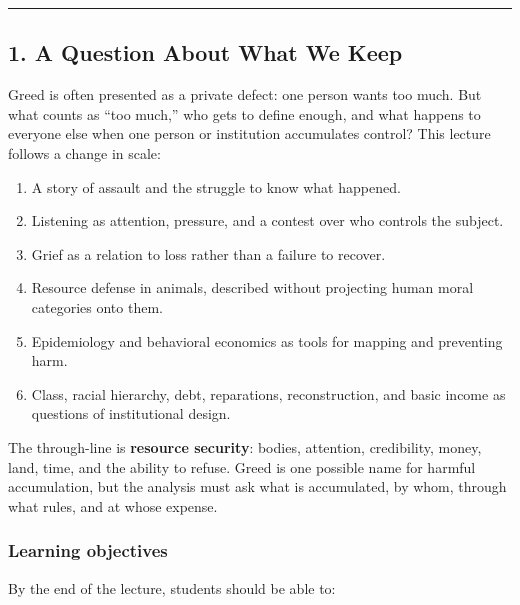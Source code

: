 \documentclass[
  11pt,
  letterpaper,
]{article}
\providecommand{\tightlist}{%
  \setlength{\itemsep}{0pt}\setlength{\parskip}{0pt}}
\begin{document}
\begin{center}\rule{0.5\linewidth}{0.5pt}\end{center}

\subsection{1. A Question About What We
Keep}\label{a-question-about-what-we-keep}

Greed is often presented as a private defect: one person wants too much.
But what counts as ``too much,'' who gets to define enough, and what
happens to everyone else when one person or institution accumulates
control? This lecture follows a change in scale:

\begin{enumerate}
\def\labelenumi{\arabic{enumi}.}
\tightlist
\item
  A story of assault and the struggle to know what happened.
\item
  Listening as attention, pressure, and a contest over who controls the
  subject.
\item
  Grief as a relation to loss rather than a failure to recover.
\item
  Resource defense in animals, described without projecting human moral
  categories onto them.
\item
  Epidemiology and behavioral economics as tools for mapping and
  preventing harm.
\item
  Class, racial hierarchy, debt, reparations, reconstruction, and basic
  income as questions of institutional design.
\end{enumerate}

The through-line is \textbf{resource security}: bodies, attention,
credibility, money, land, time, and the ability to refuse. Greed is one
possible name for harmful accumulation, but the analysis must ask what
is accumulated, by whom, through what rules, and at whose expense.

\subsubsection{Learning objectives}\label{learning-objectives}

By the end of the lecture, students should be able to:
\end{document}
